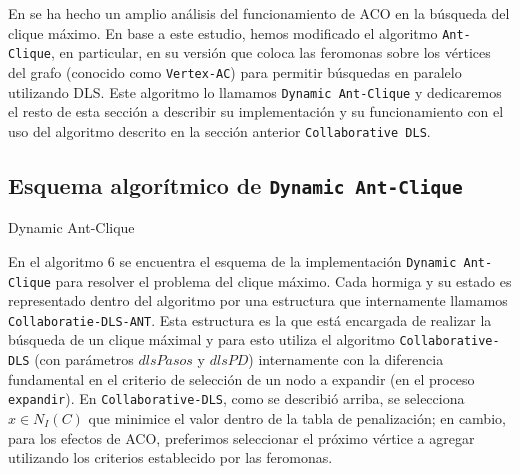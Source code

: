 \documentclass[conference]{IEEEtran}
\begin{document}
En \cite{aco1, aco2} se ha hecho un amplio análisis del funcionamiento
de ACO en la búsqueda del clique máximo. En base a este estudio, hemos
modificado el algoritmo \texttt{Ant-Clique}, en particular, en su
versión que coloca las feromonas sobre los vértices del grafo
(conocido como \texttt{Vertex-AC}) para permitir búsquedas en paralelo
utilizando DLS. Este algoritmo lo llamamos \texttt{Dynamic Ant-Clique}
y dedicaremos el resto de esta sección a describir su implementación y
su funcionamiento con el uso del algoritmo descrito en la sección
anterior  \texttt{Collaborative DLS}.

\subsection{Esquema algorítmico de \texttt{Dynamic Ant-Clique}}
\label{sec:aco:schema}

\begin{scriptsize}
\LinesNumbered
\begin{algoritmo}[htp]
\label{aco:algo}

 \caption{Dynamic Ant-Clique}
  \DontPrintSemicolon
\end{algoritmo}
\end{scriptsize}


En el algoritmo 6 se encuentra el esquema de la implementación
\texttt{Dynamic Ant-Clique} para resolver el problema del clique
máximo.  Cada hormiga y su estado es representado dentro del algoritmo
por una estructura que internamente llamamos
\texttt{Collaboratie-DLS-ANT}. Esta estructura es la que está
encargada de realizar la búsqueda de un clique máximal y para esto
utiliza el algoritmo \texttt{Collaborative-DLS} (con parámetros
$dlsPasos$ y $dlsPD$) internamente con la diferencia fundamental en el
criterio de selección de un nodo a expandir (en el proceso \texttt{expandir}). En
\texttt{Collaborative-DLS}, como se describió arriba, se selecciona $x
\in N_I(C)$ que minimice el valor dentro de la tabla de penalización;
en cambio, para los efectos de ACO, preferimos seleccionar el próximo
vértice a agregar utilizando los criterios establecido por las
feromonas.
\end{document}
